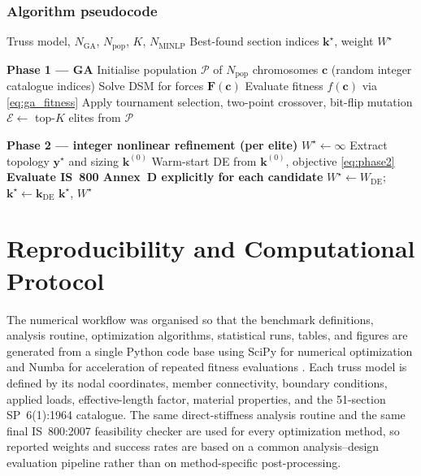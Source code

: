 \documentclass[lineno,pdflatex,sn-mathphys-num]{sn-jnl}
\begin{document}
\subsubsection{Algorithm pseudocode}

\begin{algorithm}[tbp]
\caption{GA--MINLP Hybrid Framework}
\label{alg:gaminlp}
\begin{algorithmic}[1]
\Require Truss model, $N_{\mathrm{GA}}$, $N_{\mathrm{pop}}$, $K$,
         $N_{\mathrm{MINLP}}$
\Ensure Best-found section indices $\mathbf{k}^\star$, weight $W^\star$

\State \textbf{Phase 1 --- GA}
\State Initialise population $\mathcal{P}$ of $N_{\mathrm{pop}}$
       chromosomes $\mathbf{c}$ (random integer catalogue indices)
    \State Solve DSM for forces $\mathbf{F}(\mathbf{c})$
    \State Evaluate fitness $f(\mathbf{c})$ via \cref{eq:ga_fitness}
  \EndFor
  \State Apply tournament selection, two-point crossover, bit-flip mutation
\EndFor
\State $\mathcal{E} \leftarrow$ top-$K$ elites from $\mathcal{P}$

\State \textbf{Phase 2 --- integer nonlinear refinement (per elite)}
\State $W^\star \leftarrow \infty$
  \State Extract topology $\mathbf{y}^\star$ and sizing $\mathbf{k}^{(0)}$
  \State Warm-start DE from $\mathbf{k}^{(0)}$, objective \cref{eq:phase2}
  \State \textbf{Evaluate IS~800 Annex~D explicitly for each candidate}
    \State $W^\star \leftarrow W_{\mathrm{DE}}$;
           $\mathbf{k}^\star \leftarrow \mathbf{k}_{\mathrm{DE}}$
  \EndIf
\EndFor
\State \Return $\mathbf{k}^\star$, $W^\star$
\end{algorithmic}
\end{algorithm}



\section{Reproducibility and Computational Protocol}
\label{sec:reproducibility}

The numerical workflow was organised so that the benchmark definitions,
analysis routine, optimization algorithms, statistical runs, tables, and
figures are generated from a single Python code base using SciPy for numerical optimization \citep{Virtanen2020} and Numba for acceleration of repeated fitness evaluations \citep{Lam2015}. Each truss model is
defined by its nodal coordinates, member connectivity, boundary conditions,
applied loads, effective-length factor, material properties, and the 51-section
SP~6(1):1964 catalogue. The same direct-stiffness analysis routine and the
same final IS~800:2007 feasibility checker are used for every optimization
method, so reported weights and success rates are based on a common
analysis--design evaluation pipeline rather than on method-specific post-processing.
\end{document}
